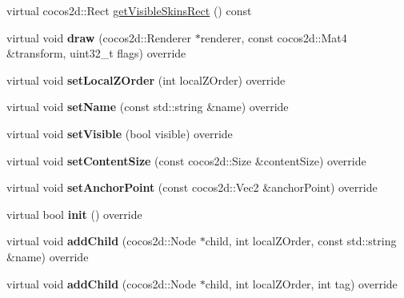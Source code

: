 \begin{DoxyCompactItemize}
\item 
virtual cocos2d\+::\+Rect \hyperlink{classBoneNode_a9307c4303a4e01793ecc2af93d856aa7}{get\+Visible\+Skins\+Rect} () const
\item 
\mbox{\label{classBoneNode_a7d6e411674122f10b8cf1f6f2fbdf098}} 
virtual void {\bfseries draw} (cocos2d\+::\+Renderer $\ast$renderer, const cocos2d\+::\+Mat4 \&transform, uint32\+\_\+t flags) override
\item 
\mbox{\label{classBoneNode_a819e868fcac95e8a2b6e5a02931081ca}} 
virtual void {\bfseries set\+Local\+Z\+Order} (int local\+Z\+Order) override
\item 
\mbox{\label{classBoneNode_afbc94c14402dd65a785b324f1adb4252}} 
virtual void {\bfseries set\+Name} (const std\+::string \&name) override
\item 
\mbox{\label{classBoneNode_a76d0526ce987d4b53bd7b4464dede749}} 
virtual void {\bfseries set\+Visible} (bool visible) override
\item 
\mbox{\label{classBoneNode_aaec9d1dd5214ac3846ee17095428ffd1}} 
virtual void {\bfseries set\+Content\+Size} (const cocos2d\+::\+Size \&content\+Size) override
\item 
\mbox{\label{classBoneNode_ae97c683b164a950fad70c7e7f7fc116e}} 
virtual void {\bfseries set\+Anchor\+Point} (const cocos2d\+::\+Vec2 \&anchor\+Point) override
\item 
\mbox{\label{classBoneNode_af6d915b1c9dea732433b32061655a099}} 
virtual bool {\bfseries init} () override
\item 
\mbox{\label{classBoneNode_a92a76a53e7f2d9d9ee15fa80f0a5ccaa}} 
virtual void {\bfseries add\+Child} (cocos2d\+::\+Node $\ast$child, int local\+Z\+Order, const std\+::string \&name) override
\item 
\mbox{\label{classBoneNode_abb12f10f6313197143bf431f0a51000e}} 
virtual void {\bfseries add\+Child} (cocos2d\+::\+Node $\ast$child, int local\+Z\+Order, int tag) override
\item 
\mbox{\label{classBoneNode_a1bc7e58f6eba513956bc70fe41370aa6}} 

\end{DoxyCompactItemize}
